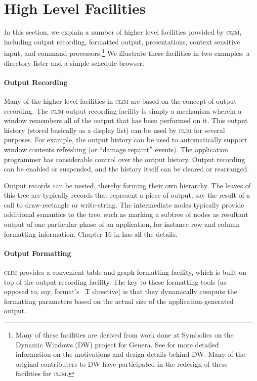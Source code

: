 \documentclass[twocolumn,a4paper]{article}
\newcommand {\code}[1]{{\sffamily #1}}
\newcommand {\CLIM}{\textsc{clim}}
\let\method\code
\begin{document}
\section{High Level Facilities} 

In this section, we explain a number of higher level facilities
provided by \CLIM{}, including output recording, formatted output,
presentations, context sensitive input, and command
processors.\footnote{Many of these facilities are derived from work
  done at Symbolics on the Dynamic Windows (DW) project for
  Genera\cite{prog-ref-manual}. See \cite{presentation-manager} for
  more detailed information on the motivations and design details
  behind DW. Many of the original contributers to DW have participated
  in the redesign of these facilities for \CLIM{}.} We illustrate
these facilities in two examples: a directory lister and a simple
schedule browser.

\paragraph*{Output Recording} Many of the higher level facilities in
\CLIM{} are based on the concept of output recording. The \CLIM{}
output recording facility is simply a mechanism wherein a window
remembers all of the output that has been performed on it. This output
history (stored basically as a display list) can be used by \CLIM{}
for several purposes. For example, the output history can be used to
automatically support window contents refreshing (or ``damage
repaint'' events).  The application programmer has considerable
control over the output history. Output recording can be enabled or
suspended, and the history itself can be cleared or rearranged.

Output records can be nested, thereby forming their own hierarchy. The
leaves of this tree are typically records that represent a piece of
output, say the result of a call to \method{draw-rectangle} or
\method{write-string}. The intermediate nodes typically provide
additional semantics to the tree, such as marking a subtree of nodes
as resultant output of one particular phase of an application, for
instance row and column formatting information. Chapter 16 in
\cite{clim-spec} has all the details.

\paragraph*{Output Formatting} \CLIM{} provides a convenient table and
graph formatting facility, which is built on top of the output
recording facility. The key to these formatting tools (as opposed to,
say, \code{format}'s \code{~T} directive) is that they dynamically compute the
formatting parameters based on the actual size of the
application-generated output.
\end{document}
